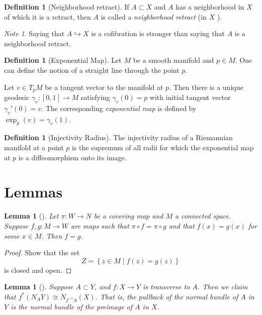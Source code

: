 \documentclass[reqno]{amsart}
\newtheorem{lemma}[theorem]{Lemma}
\theoremstyle{definition}
\newtheorem{definition}[theorem]{Definition}
\theoremstyle{remark}
\newtheorem*{note}{Note}
\begin{document}
\begin{definition}[Neighborhood retract]
    If $A \subset X$ and $A$ has a neighborhood in $X$ of
    which it is a retract, then $A$ is called
    a \textit{neighborhood retract} (in $X$ ).
\end{definition}

\begin{note}
    Saying that $A \hookrightarrow X$ is a cofibration
    is stronger than saying that $A$ is a neighborhood retract.
\end{note}



\begin{definition}[Exponential Map]
    Let $M$ be a smooth manifold and
    $p \in M$. One can define the notion of a straight line
    through the point $p$.

    Let $v \in T_pM$ be a tangent vector to the manifold
    at $p$. Then there is a unique geodesic 
    $\gamma_v \colon \left[ 0,1 \right] \to M$ satisfying
    $\gamma_v (0) = p$ with initial tangent vector
    $\gamma_v' (0) = v$.
    The corresponding \textit{exponential map} is defined
    by $\exp_p (v) = \gamma_v(1)$.
\end{definition}

\begin{definition}[Injectivity Radius]
      The injectivity
      radius of a Riemannian manifold at a point $p$
      is the supremum of
      all radii for which the exponential map
      at $p$ is a diffeomorphism onto its image.
\end{definition}



\section{Lemmas}

\begin{lemma}[]\label{Lemma:XIOOQLSJ}
    Let $\pi \colon W \to N$ be a covering map and
    $M$ a connected space. Suppose
    $f,g \colon M \to W$ are maps such that
    $\pi \circ f = \pi \circ g$ and that
    $f(x) = g(x)$ for some $x \in M$. Then
    $f = g$.
\end{lemma}

\begin{proof}
    Show that the set
    \[
    Z = \left\{ z \in M  \mid f(z) = g(z)\right\} 
    \] 
    is closed and open.
\end{proof}

\begin{lemma}[]\label{Lemma:Pullback-Of-Normal-Bundle}
    Suppose $A \subset Y$, and  $f \colon X \to Y$ is transverse to 
    $A$. Then we claim that
    $f^{*}\left( N_A Y \right) \cong 
    N_{f^{-1}A}(X)$. That is, the pullback of the normal bundle
    of $A$ in $Y$ is the normal bundle of the preimage of $A$ in $X$.
\end{lemma}
\end{document}
